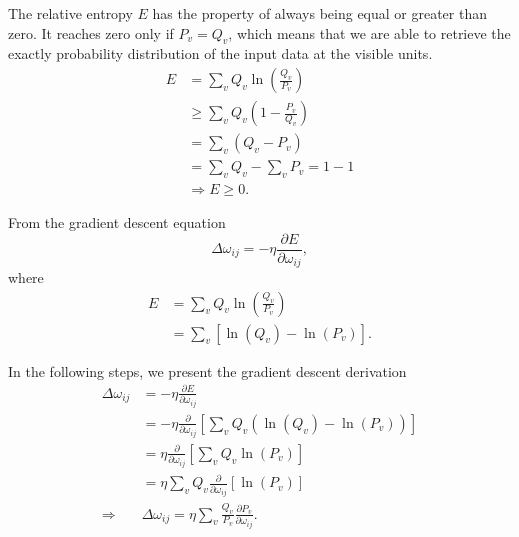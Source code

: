 The relative entropy $E$ has the property of always being equal or greater than zero. 
It reaches zero only if $P_{v} = Q_{v}$, which means that we are able to retrieve the exactly probability distribution of the input data at the visible units.
\begin{equation}
  \begin{split}
    E & = \sum_{v} Q_{v} \ln{\left( \frac{Q_{v}}{P_{v}} \right)} \\
      & \geq \sum_{v} Q_{v} \left( 1 - \frac{P_{v}}{Q_{v}} \right) \\
      & = \sum_{v} \left( Q_{v} - P_{v} \right) \\
      & = \sum_{v} Q_{v} - \sum_{v} P_{v} = 1 - 1 \\
      & \Rightarrow E \geq 0.
  \end{split}
\end{equation}

From the gradient descent equation
\begin{equation}
  \Delta \omega_{ij} = -\eta \frac{\partial E}{\partial \omega_{ij}},
  \label{eq:gradient}
\end{equation}
where
\begin{equation}
  \begin{split}
    E & = \sum_{v} Q_{v} \ln{\left(\frac{Q_{v}}{P_{v}}\right)} \\
      & = \sum_{v} \left[ \ln{(Q_{v})} - \ln{(P_{v})} \right].
  \end{split}
  \label{eq:entropy1}
\end{equation}

In the following steps, we present the gradient descent derivation
\begin{equation}
  \begin{split}
    \Delta \omega_{ij} & = - \eta \frac{\partial E}{\partial \omega_{ij}} \\
                  & = - \eta \frac{\partial}{\partial \omega_{ij}} \left[ \sum_{v} Q_{v} \left( \ln{(Q_{v})} - \ln{(P_{v})} \right) \right] \\
                  & = \eta \frac{\partial}{\partial \omega_{ij}} \left[ \sum_{v} Q_{v} \ln{(P_{v})} \right] \\
                  & = \eta \sum_{v} Q_{v} \frac{\partial}{\partial \omega_{ij}} \left[ \ln{(P_{v})} \right] \\
                  \Rightarrow & \Delta \omega_{ij} = \eta \sum_{v} \frac{Q_{v}}{P_{v}} \frac{\partial P_{v}}{\partial \omega_{ij}}.
  \end{split}
  \label{eq:grad1}
\end{equation}

